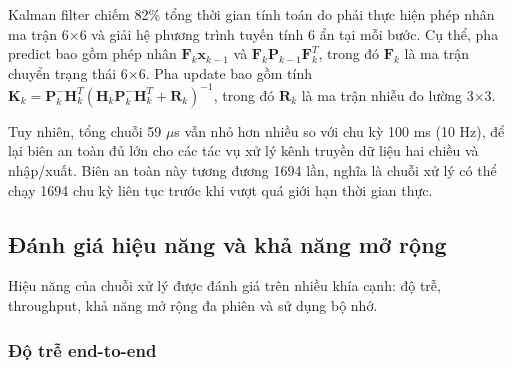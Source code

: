 \begin{table}[H]
\centering
{}
\caption{Thời gian thực thi trung bình của từng bước trong chuỗi xử lý.}
\label{tab:pipeline-timing}
\end{table}

Kalman filter chiếm 82\% tổng thời gian tính toán do phải thực hiện phép nhân ma trận 6$\times$6 và giải hệ phương trình tuyến tính 6 ẩn tại mỗi bước. Cụ thể, pha predict bao gồm phép nhân $\mathbf{F}_k \mathbf{x}_{k-1}$ và $\mathbf{F}_k \mathbf{P}_{k-1} \mathbf{F}_k^T$, trong đó $\mathbf{F}_k$ là ma trận chuyển trạng thái 6$\times$6. Pha update bao gồm tính $\mathbf{K}_k = \mathbf{P}_k^- \mathbf{H}_k^T (\mathbf{H}_k \mathbf{P}_k^- \mathbf{H}_k^T + \mathbf{R}_k)^{-1}$, trong đó $\mathbf{R}_k$ là ma trận nhiễu đo lường 3$\times$3.

Tuy nhiên, tổng chuỗi 59 $\mu$s vẫn nhỏ hơn nhiều so với chu kỳ 100 ms (10 Hz), để lại biên an toàn đủ lớn cho các tác vụ xử lý kênh truyền dữ liệu hai chiều và nhập/xuất. Biên an toàn này tương đương 1694 lần, nghĩa là chuỗi xử lý có thể chạy 1694 chu kỳ liên tục trước khi vượt quá giới hạn thời gian thực.

\subsection{Đánh giá hiệu năng và khả năng mở rộng}

\hspace{0.5cm} Hiệu năng của chuỗi xử lý được đánh giá trên nhiều khía cạnh: độ trễ, throughput, khả năng mở rộng đa phiên và sử dụng bộ nhớ.

\subsubsection{Độ trễ end-to-end}

